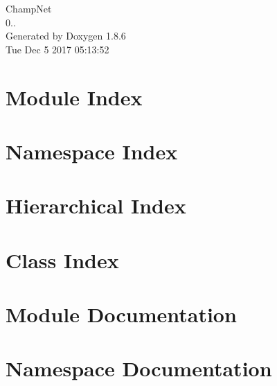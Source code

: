 \documentclass[twoside]{book}
\newcommand{\clearemptydoublepage}{%
  \newpage{\pagestyle{empty}\cleardoublepage}%
}
\begin{document}
\hypersetup{pageanchor=false}
\begin{titlepage}
\vspace*{7cm}
\begin{center}%
{\Large Champ\-Net \\[1ex]\large 0.. }\\
\vspace*{1cm}
{\large Generated by Doxygen 1.8.6}\\
\vspace*{0.5cm}
{\small Tue Dec 5 2017 05:13:52}\\
\end{center}
\end{titlepage}
\clearemptydoublepage
\tableofcontents
\clearemptydoublepage
{}
\hypersetup{pageanchor=true}

\chapter{Module Index}

\chapter{Namespace Index}

\chapter{Hierarchical Index}

\chapter{Class Index}

\chapter{Module Documentation}




\chapter{Namespace Documentation}


\end{document}

